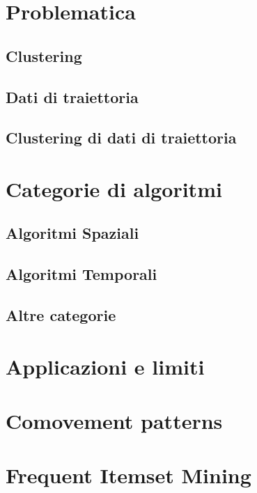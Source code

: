 
\section{Problematica}\label{sec:problem}


\subsection{Clustering}\label{subsec:clustering-problem}


\subsection{Dati di traiettoria}\label{subsec:trajectorydata-problem}


\subsection{Clustering di dati di traiettoria}\label{subsec:trajectoryclustering-problem}


\section{Categorie di algoritmi}\label{sec:categories}

\subsection{Algoritmi Spaziali}\label{subsec:spatialalgorithms}

\subsection{Algoritmi Temporali}\label{subsec:temporalalgorithms}

\subsection{Altre categorie}\label{subsec:othersalgorithms}

\section{Applicazioni e limiti}\label{sec:applicationandlimits}

\section{Comovement patterns}\label{sec:comovements-pattern}

\section{Frequent Itemset Mining}\label{sec:frequent-itemset-mining}

